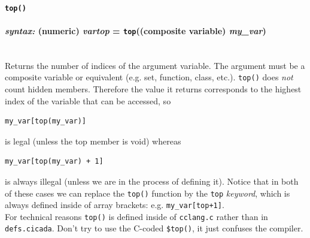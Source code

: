 \documentclass{article}
\newenvironment{code}{
       \begin{list}{}{
               \setlength{\leftmargin}{.4in}
               \setlength{\rightmargin}{0in}
               \setlength{\topsep}{.2in}
       }
       \small
       \item[] }
       { \end{list}   }
\begin{document}






\paragraph{\texttt{top()}\\\\
\normalfont \emph{syntax: } (numeric) \emph{vartop} = \texttt{top}((composite variable) \emph{my\_var})\\\\}

Returns the number of indices of the argument variable.  The argument must be a composite variable or equivalent (e.g. set, function, class, etc.).  \texttt{top()} does \emph{not} count hidden members.  Therefore the value it returns corresponds to the highest index of the variable that can be accessed, so

\begin{code} \begin{verbatim}
my_var[top(my_var)]
\end{verbatim} \end{code}

\noindent is legal (unless the top member is void) whereas

\begin{code} \begin{verbatim}
my_var[top(my_var) + 1]
\end{verbatim} \end{code}

\noindent is always illegal (unless we are in the process of defining it).  Notice that in both of these cases we can replace the \verb#top()# function by the \verb#top# \emph{keyword}, which is always defined inside of array brackets:  e.g. \verb#my_var[top+1]#.\\

For technical reasons \verb#top()# is defined inside of \verb#cclang.c# rather than in \verb#defs.cicada#.  Don't try to use the C-coded \verb#$top()#, it just confuses the compiler.





\end{document}
